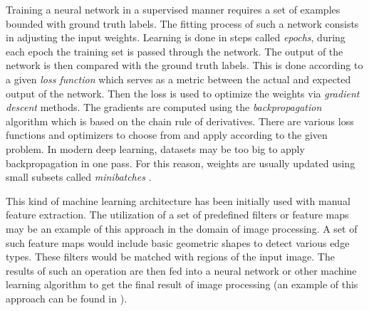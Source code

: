 Training a neural network in a supervised manner requires a set of examples bounded with ground truth labels.
The fitting process of such a network consists in adjusting the input weights.
Learning is done in steps called \textit{epochs}, during each epoch the training set is passed through the network.
The output of the network is then compared with the ground truth labels.
This is done according to a given \textit{loss function} which serves as a metric between the actual and expected output of the network.
Then the loss is used to optimize the weights via \textit{gradient descent} methods.
The gradients are computed using the \textit{backpropagation} algorithm which is based on the chain rule of derivatives.
There are various loss functions and optimizers to choose from and apply according to the given problem.
In modern deep learning, datasets may be too big to apply backpropagation in one pass.
For this reason, weights are usually updated using small subsets called \textit{minibatches} \cite{goodfellow-2016-deeplearning}.

This kind of machine learning architecture has been initially used with manual feature extraction.
The utilization of a set of predefined filters or feature maps may be an example of this approach in the domain of image processing.
A set of such feature maps would include basic geometric shapes to detect various edge types.
These filters would be matched with regions of the input image.
The results of such an operation are then fed into a neural network or other machine learning algorithm to get the final result of image processing
(an example of this approach can be found in \cite{viola-2001-cascade}).

